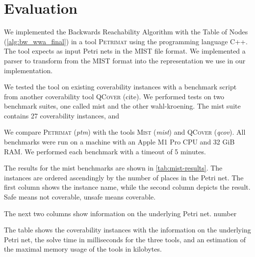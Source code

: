 \chapter{Evaluation}\label{chapter:evaluation}
We implemented the Backwards Reachability Algorithm with the Table of Nodes (\autoref{alg:bw_wwa_final}) in a tool \textsc{Petrimat} using the programming language C++. The tool expects as input Petri nets in the MIST file format. We implemented a parser to transform from the MIST format into the representation we use in our implementation.  

We tested the tool on existing coverability instances with a benchmark script from another coverability tool \textsc{QCover} (cite). 
We performed tests on two benchmark suites, one called mist and the other wahl-kroening. The mist suite contains 27 coverability instances, and

We compare \textsc{Petrimat} (\textit{ptm}) with the tools \textsc{Mist} (\textit{mist}) and \textsc{QCover} (\textit{qcov}). All benchmarks were run on a machine with an Apple M1 Pro CPU and 32 GiB RAM. We performed each benchmark with a timeout of 5 minutes. 

The results for the mist benchmarks are shown in \autoref{tab:mist-results}.
The instances are ordered ascendingly by the number of places in the Petri net. 
The first column shows the instance name, while the second column depicts the result. Safe means not coverable, unsafe means coverable.

The next two columns show information on the underlying Petri net. number

The table shows the coverability instances with the information on the underlying Petri net, the solve time in milliseconds for the three tools, and an estimation of the maximal memory usage of the tools in kilobytes. 


